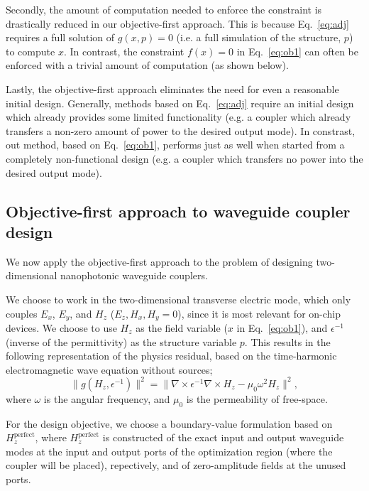 \documentclass[letterpaper,10pt]{article}
\begin{document}
Secondly, the amount of computation needed to enforce the constraint is
    drastically reduced in our objective-first approach.
This is because Eq.~\ref{eq:adj} requires a full solution of $g(x,p)=0$
    (i.e. a full simulation of the structure, $p$) to compute $x$.
In contrast, the constraint $f(x)=0$ in Eq.~\ref{eq:ob1} 
    can often be enforced with a trivial amount of computation (as shown below).

Lastly, the objective-first approach eliminates the need for even a reasonable
    initial design.
Generally, methods based on Eq.~\ref{eq:adj} require an initial design which
    already provides some limited functionality
    (e.g. a coupler which already transfers 
    a non-zero amount of power to the desired output mode).
In constrast, out method, based on Eq.~\ref{eq:ob1}, performs just as well
    when started from a completely non-functional design 
    (e.g. a coupler which transfers no power into the desired output mode).

\subsection{Objective-first approach to waveguide coupler design}
We now apply the objective-first approach to the problem of designing 
    two-dimensional nanophotonic waveguide couplers.

We choose to work in the two-dimensional transverse electric mode,
    which only couples $E_x$, $E_y$, and $H_z$ ($E_z, H_x, H_y = 0$),
    since it is most relevant for on-chip devices.
We choose to use $H_z$ as the field variable ($x$ in Eq.~\ref{eq:ob1}), 
    and $\epsilon^{-1}$ (inverse of the permittivity) 
    as the structure variable $p$.
This results in the following representation of the physics residual, 
    based on the time-harmonic electromagnetic wave equation without sources;
    \begin{equation}
    \|g(H_z, \epsilon^{-1})\|^2 = 
    \| \nabla \times \epsilon^{-1} \nabla \times H_z - \mu_0 \omega^2 H_z \|^2,
    \end{equation}
    where $\omega$ is the angular frequency,
    and $\mu_0$ is the permeability of free-space.

For the design objective, we choose a boundary-value formulation
    based on $H_z^\text{perfect}$,
    where $H_z^\text{perfect}$ is constructed 
    of the exact input and output waveguide modes at the input and output ports
    of the optimization region (where the coupler will be placed),
    repectively, and of zero-amplitude fields at the unused ports.
\end{document}
